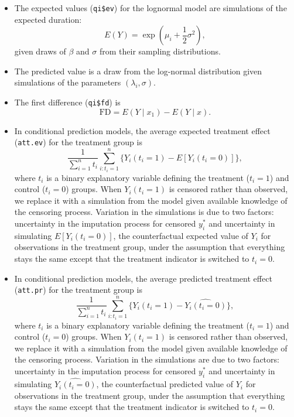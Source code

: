 \begin{itemize}
\item The expected values ({\tt qi\$ev}) for the lognormal model are
  simulations of the expected duration:  
\begin{equation*}
E(Y) =  \exp\left(\mu_i + \frac{1}{2}\sigma^2 \right),
\end{equation*}
given draws of $\beta$ and $\sigma$ from their sampling distributions. 

\item The predicted value is a draw from the log-normal distribution
  given simulations of the parameters $(\lambda_i, \sigma)$.

\item The first difference ({\tt qi\$fd}) is
\begin{equation*}
\textrm{FD} = E(Y \mid x_1) - E(Y \mid x). 
\end{equation*}

\item In conditional prediction models, the average expected treatment
  effect ({\tt att.ev}) for the treatment group is \begin{equation*}
  \frac{1}{\sum_{i=1}^n t_i}\sum_{i:t_i=1}^n \{ Y_i(t_i=1) - E[Y_i(t_i=0)] \}, \end{equation*} where $t_i$ is a binary explanatory variable
  defining the treatment ($t_i=1$) and control ($t_i=0$) groups. When
  $Y_i(t_i=1)$ is censored rather than observed, we replace it with a
  simulation from the model given available knowledge of the censoring
  process.  Variation in the simulations is due to two factors:
  uncertainty in the imputation process for censored $y_i^*$ and
  uncertainty in simulating $E[Y_i(t_i=0)]$, the counterfactual
  expected value of $Y_i$ for observations in the treatment group,
  under the assumption that everything stays the same except that the
  treatment indicator is switched to $t_i=0$.

\item In conditional prediction models, the average predicted treatment
  effect ({\tt att.pr}) for the treatment group is 
\begin{equation*}
  \frac{1}{\sum_{i=1}^n t_i} \sum_{i:t_i=1}^n \{  Y_i(t_i=1) -
\widehat{Y_i(t_i=0)} \}, 
\end{equation*} 
where $t_i$ is a binary explanatory
  variable defining the treatment ($t_i=1$) and control ($t_i=0$)
  groups.  When $Y_i(t_i=1)$ is censored rather than observed, we
  replace it with a simulation from the model given available
  knowledge of the censoring process.  Variation in the simulations
  are due to two factors: uncertainty in the imputation process for
  censored $y_i^*$ and uncertainty in simulating
  $\widehat{Y_i(t_i=0)}$, the counterfactual predicted value of $Y_i$
  for observations in the treatment group, under the assumption that
  everything stays the same except that the treatment indicator is
  switched to $t_i=0$.

\end{itemize}


